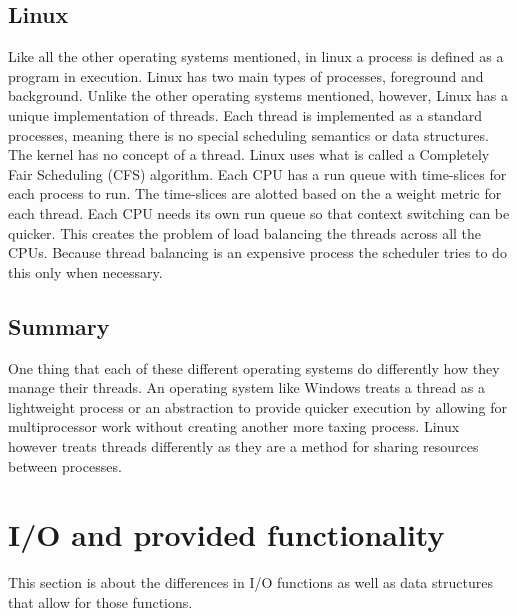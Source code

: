 \documentclass[a4paper,10pt,onecolumn]{article}
\begin{document}
\subsection{Linux}
Like all the other operating systems mentioned, in linux a process is defined as a program in execution. Linux has two main types of processes, foreground and background.\newline
Unlike the other operating systems mentioned, however, Linux has a unique implementation of threads. Each thread is implemented as a standard processes, meaning there is no special scheduling semantics or data structures. The kernel has no concept of a thread.
\newline
\newline
Linux uses what is called a {C}ompletely {F}air {S}cheduling {(CFS)} algorithm. Each CPU has a run queue with time-slices for each process to run. The time-slices are alotted based on the a weight metric for each thread. Each CPU needs its own run queue so that context switching can be quicker. This creates the problem of load balancing the threads across all the CPUs. Because thread balancing is an expensive process the scheduler tries to do this only when necessary. \cite{themorningpaper}

\subsection{Summary}
One thing that each of these different operating systems do differently how they manage their threads. An operating system like Windows treats a thread as a lightweight process or an abstraction to provide quicker execution by allowing for multiprocessor work without creating another more taxing process. Linux however treats threads differently as they are a method for sharing resources between processes.\cite{love_2005} 

\section{I/O and provided functionality}
This section is about the differences in I/O functions as well as data structures that allow for those functions.
\end{document}
